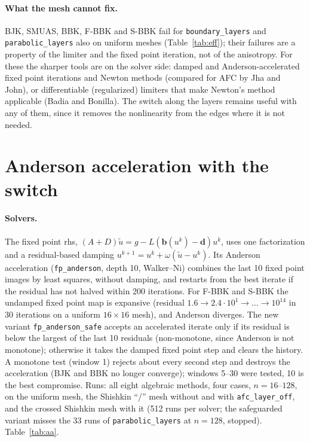\documentclass[11pt]{article}
\begin{document}
\paragraph{What the mesh cannot fix.} BJK, SMUAS, BBK, F-BBK and S-BBK fail for \texttt{boundary\_layers} and
\texttt{parabolic\_layers} also on uniform meshes (Table~\ref{tab:eff}); their failures are a property of the limiter
and the fixed point iteration, not of the anisotropy. For these the sharper tools are on the solver side: damped and
Anderson-accelerated fixed point iterations and Newton methods (compared for AFC by Jha and John), or differentiable
(regularized) limiters that make Newton's method applicable (Badia and Bonilla). The switch along the layers remains
useful with any of them, since it removes the nonlinearity from the edges where it is not needed.

\section{Anderson acceleration with the switch}\label{sec:aa}

\paragraph{Solvers.} The fixed point rhs, $(A+D)\tilde u=g-L(\boldsymbol b(u^k)-\boldsymbol d)u^k$, uses one
factorization and a residual-based damping $u^{k+1}=u^k+\omega(\tilde u-u^k)$. Its Anderson acceleration
(\texttt{fp\_anderson}, depth 10, Walker--Ni) combines the last 10 fixed point images by least squares, without damping,
and restarts from the best iterate if the residual has not halved within 200 iterations. For F-BBK and S-BBK the
undamped fixed point map is expansive (residual $1.6\to2.4\cdot10^1\to\dots\to10^{14}$ in 30 iterations on a uniform
$16\times16$ mesh), and Anderson diverges. The new variant \texttt{fp\_anderson\_safe} accepts an accelerated iterate
only if its residual is below the largest of the last 10 residuals (non-monotone, since Anderson is not monotone);
otherwise it takes the damped fixed point step and clears the history. A monotone test (window 1) rejects about every
second step and destroys the acceleration (BJK and BBK no longer converge); windows 5--30 were tested, 10 is the
best compromise. Runs: all eight algebraic methods, four cases, $n=16$--$128$, on the uniform mesh, the Shishkin
``/'' mesh without and with \texttt{afc\_layer\_off}, and the crossed Shishkin mesh with it (512 runs per solver;
the safeguarded variant misses the 33 runs of \texttt{parabolic\_layers} at $n=128$, stopped). Table~\ref{tab:aa}.
\end{document}
